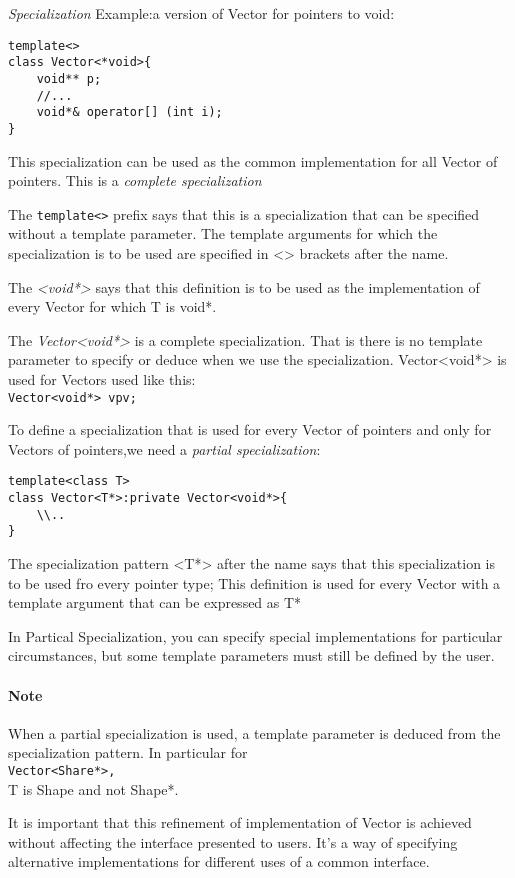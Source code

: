 \documentclass[11pt, a4paper]{book}
\begin{document}
\emph{Specialization} Example:a version of Vector for pointers to void:
\begin{verbatim}
template<>
class Vector<*void>{
    void** p;
    //...
    void*& operator[] (int i);
}
\end{verbatim}

This specialization can be used as the common implementation for all Vector of pointers. This is a \emph{complete specialization}

The \verb|template<>| prefix says that this is a specialization that can be specified without a template parameter. The template arguments for which the specialization is to be used are specified in <> brackets after the name.

The \emph{<void*>} says that this definition is to be used as the implementation of every Vector for which T is void*. 

The \emph{Vector<void*>} is a complete specialization. That is there is no template parameter to specify or deduce when we use the specialization. Vector<void*> is used for Vectors used like this:\\\verb|Vector<void*> vpv;|

To define a specialization that is used for every Vector of pointers and only for Vectors of pointers,we need a \emph{partial specialization}:
\begin{verbatim}
template<class T>
class Vector<T*>:private Vector<void*>{
    \\..
}
\end{verbatim}

The specialization pattern <T*> after the name says that this specialization is to be used fro every pointer type; This definition is used for every Vector with a template argument that can be expressed as T*

In Partical Specialization, you can specify special implementations for particular circumstances, but some template parameters must still be defined by the user.

\paragraph{Note} When a partial specialization is used, a template parameter is deduced from the specialization pattern. In particular for \\\verb|Vector<Share*>, |\\ T is Shape and not Shape*.

It is important that this refinement of implementation of Vector is achieved without affecting the interface presented to users. It's a way of specifying alternative implementations for different uses of a common interface.
\end{document}

